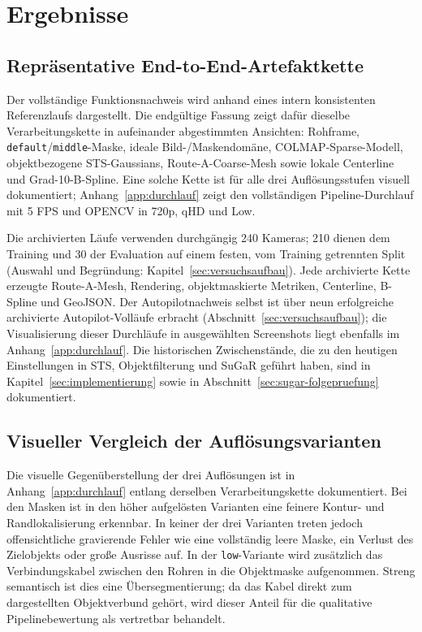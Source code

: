 \section{Ergebnisse}

\subsection{Repräsentative End-to-End-Artefaktkette}

Der vollständige Funktionsnachweis wird anhand eines intern konsistenten
Referenzlaufs dargestellt. Die endgültige Fassung zeigt dafür dieselbe
Verarbeitungskette in aufeinander abgestimmten Ansichten: Rohframe,
\texttt{default}/\texttt{middle}-Maske, ideale Bild-/Maskendomäne,
COLMAP-Sparse-Modell, objektbezogene STS-Gaussians, Route-A-Coarse-Mesh sowie
lokale Centerline und Grad-10-B-Spline. Eine solche Kette ist für alle drei
Auflösungsstufen visuell dokumentiert; Anhang~\ref{app:durchlauf} zeigt den
vollständigen Pipeline-Durchlauf mit 5 FPS und OPENCV in 720p, qHD und Low.

Die archivierten Läufe verwenden durchgängig 240 Kameras; 210 dienen dem
Training und 30 der Evaluation auf einem festen, vom Training getrennten
Split (Auswahl und Begründung: Kapitel~\ref{sec:versuchsaufbau}). Jede
archivierte Kette erzeugte Route-A-Mesh,
Rendering, objektmaskierte Metriken, Centerline, B-Spline und GeoJSON. Der
Autopilotnachweis selbst ist über neun erfolgreiche archivierte Autopilot-Volläufe erbracht
(Abschnitt~\ref{sec:versuchsaufbau}); die Visualisierung dieser Durchläufe in
ausgewählten Screenshots liegt ebenfalls im Anhang~\ref{app:durchlauf}. Die
historischen Zwischenstände, die zu den heutigen Einstellungen in STS,
Objektfilterung und SuGaR geführt haben, sind in
Kapitel~\ref{sec:implementierung} sowie in
Abschnitt~\ref{sec:sugar-folgepruefung} dokumentiert.

\subsection{Visueller Vergleich der Auflösungsvarianten}
\label{sec:visueller-aufloesungsvergleich}

Die visuelle Gegenüberstellung der drei Auflösungen ist in
Anhang~\ref{app:durchlauf} entlang derselben Verarbeitungskette dokumentiert.
Bei
den Masken ist in den höher aufgelösten Varianten eine feinere Kontur- und
Randlokalisierung erkennbar. In keiner der drei Varianten treten jedoch
offensichtliche gravierende Fehler wie eine vollständig leere Maske, ein
Verlust des Zielobjekts oder große Ausrisse auf. In der \texttt{low}-Variante
wird zusätzlich das Verbindungskabel zwischen den Rohren in die Objektmaske
aufgenommen. Streng semantisch ist dies eine Übersegmentierung; da das Kabel
direkt zum dargestellten Objektverbund gehört, wird dieser Anteil für die
qualitative Pipelinebewertung als vertretbar behandelt.

